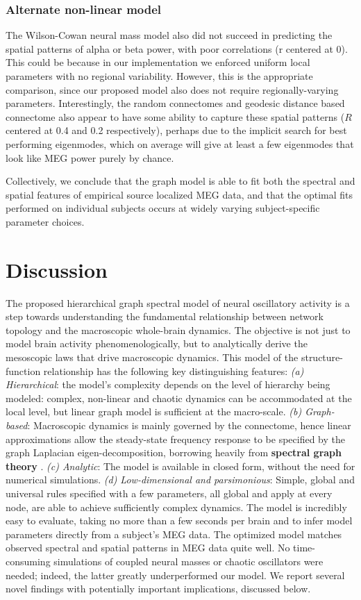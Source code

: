 \subsubsection{Alternate non-linear model}
The Wilson-Cowan neural mass model also did not succeed in predicting the spatial patterns of alpha or beta power, with poor correlations (r centered at 0). This could be because
in our implementation we enforced uniform local parameters with no
regional variability. However, this is the appropriate comparison, since
our proposed model also does not require regionally-varying parameters.
Interestingly, the random connectomes and geodesic distance based
connectome also appear to have some ability to capture these spatial
patterns ($R$ centered at 0.4 and 0.2 respectively), perhaps due to the
implicit search for best performing eigenmodes, which on average will
give at least a few eigenmodes that look like MEG power purely by
chance.

Collectively, we conclude that the graph model is able to fit both the
spectral and spatial features of empirical source localized MEG data,
and that the optimal fits performed on individual subjects occurs at
widely varying subject-specific parameter choices.

\section{Discussion}

The proposed hierarchical graph spectral model of neural oscillatory
activity is a step towards understanding the fundamental relationship
between network topology and the macroscopic whole-brain dynamics. The
objective is not just to model brain activity phenomenologically, but to
analytically derive the mesoscopic laws that drive macroscopic dynamics.
This model of the structure-function relationship has the following key
distinguishing features: \emph{(a) Hierarchical}: the model's
complexity depends on the level of hierarchy being modeled: complex,
non-linear and chaotic dynamics can be accommodated at the local level,
but linear graph model is sufficient at the macro-scale. \emph{(b)
Graph-based}: Macroscopic dynamics is mainly governed by the
connectome, hence linear approximations allow the steady-state frequency
response to be specified by the graph Laplacian eigen-decomposition,
borrowing heavily from \textbf{spectral graph theory}
\cite{auffarth_spectral_2007,Kondor02diffusionkernels,larsen_medical_2006,Ng01onspectral}. \emph{(c) Analytic}: The model is
available in closed form, without the need for numerical simulations.
\emph{(d) Low-dimensional and parsimonious}: Simple, global and
universal rules specified with a few parameters, all global and apply at
every node, are able to achieve sufficiently complex dynamics. The model
is incredibly easy to evaluate, taking no more than a few seconds per
brain and to infer model parameters directly from a subject's MEG data.
The optimized model matches observed spectral and spatial patterns in
MEG data quite well. No time-consuming simulations of coupled neural
masses or chaotic oscillators were needed; indeed, the latter greatly
underperformed our model. We report several novel findings with
potentially important implications, discussed below.

